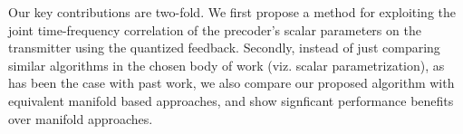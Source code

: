 \documentclass[journal,10pt,twocolumn]{IEEEtran}
\begin{document}
Our key contributions are two-fold.  We first propose a method for exploiting the
joint time-frequency correlation of the precoder's scalar parameters
on the transmitter using the quantized feedback.
Secondly, instead of just comparing similar algorithms in the chosen body of work (viz. scalar parametrization), as has been the case with past work, we also compare our proposed algorithm with equivalent manifold based approaches, and show signficant performance benefits over manifold approaches.




\end{document}

